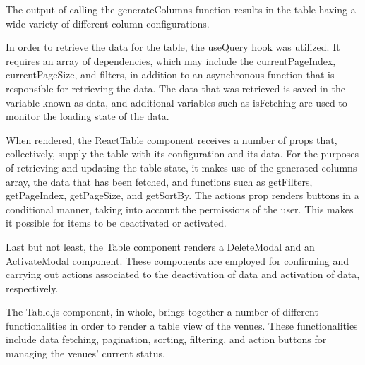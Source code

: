 \begin{justify}
\begin{itemize}
\begin{itemize}
                    \vspace{0.25cm}
                    \newendline The output of calling the generateColumns function results in the table having a wide variety of different column configurations.
                    
                    \vspace{0.25cm}
                    \newendline In order to retrieve the data for the table, the useQuery hook  was utilized. It requires an array of dependencies, which may include the currentPageIndex, currentPageSize, and filters, in addition to an asynchronous function that is responsible for retrieving the data. The data that was retrieved is saved in the variable known as data, and additional variables such as isFetching are used to monitor the loading state of the data.
                    
                    \vspace{0.25cm}
                    \newendline When rendered, the ReactTable component receives a number of props that, collectively, supply the table with its configuration and its data. For the purposes of retrieving and updating the table state, it makes use of the generated columns array, the data that has been fetched, and functions such as getFilters, getPageIndex, getPageSize, and getSortBy. The actions prop renders buttons in a conditional manner, taking into account the permissions of the user. This makes it possible for items to be deactivated or activated.
                    
                    \vspace{0.25cm}
                    \newendline Last but not least, the Table component renders a DeleteModal and an ActivateModal component. These components are employed for confirming and carrying out actions associated to the deactivation of data and activation of data, respectively.
                    
                    \vspace{0.25cm}
                    \newendline The Table.js component, in whole, brings together a number of different functionalities in order to render a table view of the venues. These functionalities include data fetching, pagination, sorting, filtering, and action buttons for managing the venues' current status.


\end{itemize}
\end{itemize}
\end{justify}
